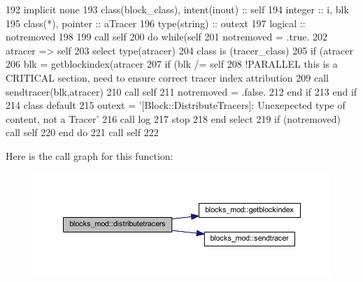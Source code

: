 \begin{DoxyCode}
192     \textcolor{keywordtype}{implicit none}
193     \textcolor{keywordtype}{class}(block\_class), \textcolor{keywordtype}{intent(inout)} :: self
194     \textcolor{keywordtype}{integer} :: i, blk
195     \textcolor{keywordtype}{class}(*), \textcolor{keywordtype}{pointer} :: aTracer
196     \textcolor{keywordtype}{type}(string) :: outext
197     \textcolor{keywordtype}{logical} :: notremoved
198 
199     \textcolor{keyword}{call }self%
200     \textcolor{keywordflow}{do} \textcolor{keywordflow}{while}(self%
201         notremoved = .true.
202         atracer => self%
203         \textcolor{keywordflow}{select type}(atracer)
204 \textcolor{keywordflow}{        class is} (tracer\_class)
205             \textcolor{keywordflow}{if} (atracer%
206                 blk = getblockindex(atracer%
207                 \textcolor{keywordflow}{if} (blk /= self%
208                     \textcolor{comment}{!PARALLEL this is a CRITICAL section, need to ensure correct tracer index attribution}
209                     \textcolor{keyword}{call }sendtracer(blk,atracer)
210                     \textcolor{keyword}{call }self%
211                     notremoved = .false.
212 \textcolor{keywordflow}{                end if}
213 \textcolor{keywordflow}{            end if}
214 \textcolor{keywordflow}{            class default}
215             outext = \textcolor{stringliteral}{'[Block::DistributeTracers]: Unexepected type of content, not a Tracer'}
216             \textcolor{keyword}{call }log%
217             stop
218 \textcolor{keywordflow}{        end select}
219         \textcolor{keywordflow}{if} (notremoved) \textcolor{keyword}{call }self%
220 \textcolor{keywordflow}{    end do}
221     \textcolor{keyword}{call }self%
222 
\end{DoxyCode}
Here is the call graph for this function\+:\nopagebreak
\begin{figure}[H]
\begin{center}
\leavevmode
\includegraphics[width=350pt]{namespaceblocks__mod_aa178415bcc40cf169744d356e1a09c6b_cgraph}
\end{center}
\end{figure}
